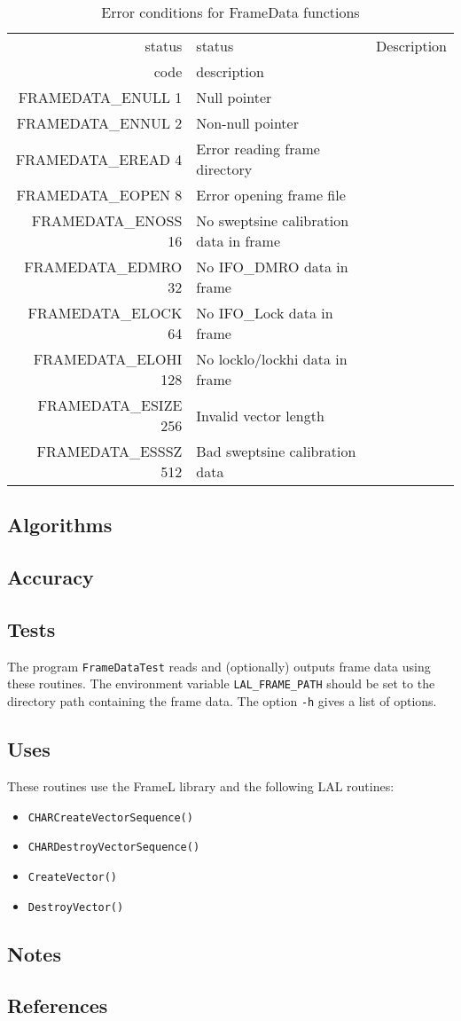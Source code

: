 \documentclass{article}
\begin{document}
\begin{table}
\begin{tabular}{|r|l|p{2in}|}\hline
status  & status          & Description\\
code    & description     & \\\hline
FRAMEDATA\_ENULL 1    &  Null pointer & \\
FRAMEDATA\_ENNUL 2    &  Non-null pointer & \\
FRAMEDATA\_EREAD 4    &  Error reading frame directory & \\
FRAMEDATA\_EOPEN 8    &  Error opening frame file & \\
FRAMEDATA\_ENOSS 16   &  No sweptsine calibration data in frame & \\
FRAMEDATA\_EDMRO 32   &  No IFO\_DMRO data in frame & \\
FRAMEDATA\_ELOCK 64   &  No IFO\_Lock data in frame & \\
FRAMEDATA\_ELOHI 128  &  No locklo/lockhi data in frame & \\
FRAMEDATA\_ESIZE 256  &  Invalid vector length & \\
FRAMEDATA\_ESSSZ 512  &  Bad sweptsine calibration data & \\
\hline
\end{tabular}
\caption{Error conditions for FrameData functions}\label{tbl:CV}
\end{table}

\subsection{Algorithms}

\subsection{Accuracy}

\subsection{Tests}

The program \texttt{FrameDataTest} reads and (optionally) outputs frame data
using these routines.  The environment variable \texttt{LAL\_FRAME\_PATH}
should be set to the directory path containing the frame data.  The option
\texttt{-h} gives a list of options.

\subsection{Uses}

These routines use the FrameL library and the following LAL routines:
\begin{itemize}
\item\texttt{CHARCreateVectorSequence()}
\item\texttt{CHARDestroyVectorSequence()}
\item\texttt{CreateVector()}
\item\texttt{DestroyVector()}
\end{itemize}

\subsection{Notes}

\subsection{References}
\end{document}
